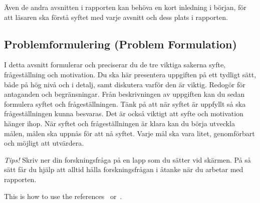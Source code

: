 \"{A}ven de andra avsnitten i rapporten kan beh\"{o}va en kort inledning i b\"{o}rjan, f\"{o}r att l\"{a}saren ska f\"{o}rst\r{a} syftet med varje avsnitt och dess plats i rapporten.


\subsection{Problemformulering (Problem Formulation)} 

I detta avsnitt formulerar och preciserar du de tre viktiga sakerna syfte, fr\r{a}gest\"{a}llning och motivation. Du ska h\"{a}r presentera uppgiften p\r{a} ett tydligt s\"{a}tt, b\r{a}de p\r{a} h\"{o}g niv\r{a} och i detalj, samt diskutera varf\"{o}r den \"{a}r viktig. Redog\"{o}r f\"{o}r antaganden och begr\"{a}nsningar. Fr\r{a}n beskrivningen av uppgiften kan du sedan formulera syftet och fr\r{a}gest\"{a}llningen. T\"{a}nk p\r{a} att n\"{a}r syftet \"{a}r uppfyllt s\r{a} ska fr\r{a}gest\"{a}llningen kunna besvaras. Det \"{a}r ocks\r{a} viktigt att syfte och motivation h\"{a}nger ihop. N\"{a}r syftet och fr\r{a}gest\"{a}llningen \"{a}r klara kan du b\"{o}rja utveckla m\r{a}len, m\r{a}len ska uppn\r{a}s f\"{o}r att n\r{a} syftet. Varje m\r{a}l ska vara litet, genomf\"{o}rbart och m\"{o}jligt att utv\"{a}rdera.  


\emph{Tips!} Skriv ner din forskningsfr\r{a}ga p\r{a} en lapp som du s\"{a}tter vid sk\"{a}rmen. P\r{a} s\r{a} s\"{a}tt f\r{a}r du hj\"{a}lp att alltid h\r{a}lla forskningsfr\r{a}gan i \r{a}tanke n\"{a}r du arbetar med rapporten.

This is how to use the references~\cite{Berndtsson607210, Blomkvist2014} or~\cite{Turing1950}.



